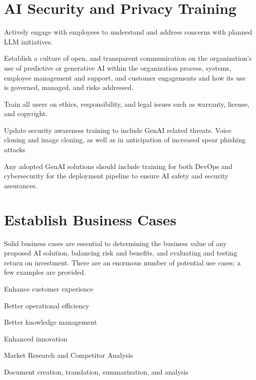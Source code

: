 \section{AI Security and Privacy Training}

\begin{minipage}{\linewidth}
\begin{checklist}
  \item Actively engage with employees to understand and address concerns with planned LLM initiatives.
  \item Establish a culture of open, and transparent communication on the organization's use of predictive or generative AI within the organization process, systems, employee management and support, and customer engagements and how its use is governed, managed, and risks addressed.
  \item Train all users on ethics, responsibility, and legal issues such as warranty, license, and copyright.
  \item Update security awareness training to include GenAI related threats. Voice cloning and image cloning, as well as in anticipation of increased spear phishing attacks
  \item Any adopted GenAI solutions should include training for both DevOps and cybersecurity for the deployment pipeline to ensure AI safety and security assurances.
\end{checklist}
\end{minipage}

\section{Establish Business Cases}
Solid business cases are essential to determining the business value of any proposed AI solution, balancing risk and benefits, and evaluating and testing return on investment. There are an enormous number of potential use cases; a few examples are provided.

\begin{minipage}{\linewidth}
\begin{checklist}
  \item Enhance customer experience
  \item Better operational efficiency
  \item Better knowledge management
  \item Enhanced innovation
  \item Market Research and Competitor Analysis
  \item Document creation, translation, summarization, and analysis
\end{checklist}
\end{minipage}

